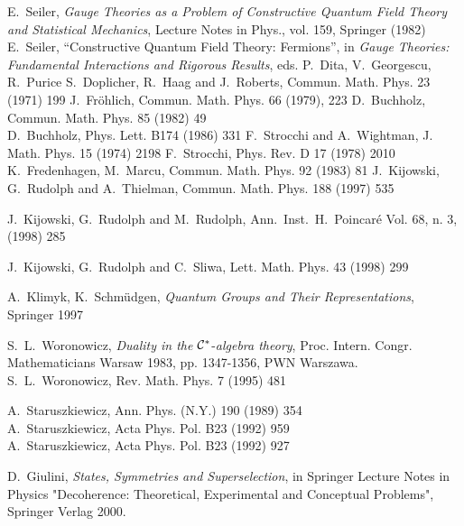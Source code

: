 \documentclass[a4paper,12pt]{article}
\begin{document}
\begin{thebibliography}{99}
E.~Seiler, {\em Gauge Theories as a Problem of Constructive
Quantum Field Theory and Statistical Mechanics}, Lecture Notes in
Phys., vol. 159, Springer (1982) \\ E.~Seiler, ``Constructive
Quantum Field Theory: Fermions'', in {\em Gauge Theories:
Fundamental Interactions and Rigorous Results}, eds. P.~Dita,
V.~Georgescu, R.~Purice
S.~Doplicher, R.~Haag and J.~Roberts, Commun. Math. Phys. 23
(1971) 199
J.~Fr\"ohlich, Commun. Math. Phys. 66 (1979), 223
D.~Buchholz, Commun. Math. Phys. 85 (1982) 49 \\ D.~Buchholz,
Phys. Lett. B174 (1986) 331
F.~Strocchi and A.~Wightman, J. Math. Phys. 15 (1974) 2198
F.~Strocchi, Phys. Rev. D 17 (1978) 2010
K.~Fredenhagen, M.~Marcu, Commun. Math. Phys. 92 (1983) 81
J.~Kijowski, G.~Rudolph and A.~Thielman, Commun. Math. Phys. 188
(1997) 535

J.~Kijowski, G.~Rudolph and M.~Rudolph, Ann.~Inst.~H.~Poincar\'e
Vol. 68, n. 3, (1998) 285

J.~Kijowski, G.~Rudolph and C.~Sliwa, Lett. Math. Phys. 43 (1998)
299

A.~Klimyk, K.~Schm\"udgen, {\em Quantum Groups and Their
Representations}, Springer 1997

S.~L.~Woronowicz, {\em Duality in the} ${\cal C}^*$-{\em algebra
theory}, Proc. Intern. Congr. Mathematicians Warsaw 1983, pp.
1347-1356, PWN Warszawa.
\\
 S.~L.~Woronowicz, Rev. Math. Phys. 7 (1995) 481

 A.~Staruszkiewicz, Ann. Phys. (N.Y.) 190 (1989) 354
\\
A.~Staruszkiewicz, Acta Phys. Pol. B23 (1992) 959
\\
A.~Staruszkiewicz, Acta Phys. Pol. B23 (1992) 927



 D.~Giulini, {\em States, Symmetries and
Superselection}, in Springer Lecture Notes in Physics
"Decoherence: Theoretical, Experimental and Conceptual Problems",
Springer Verlag 2000.



\end{thebibliography}
\end{document}
